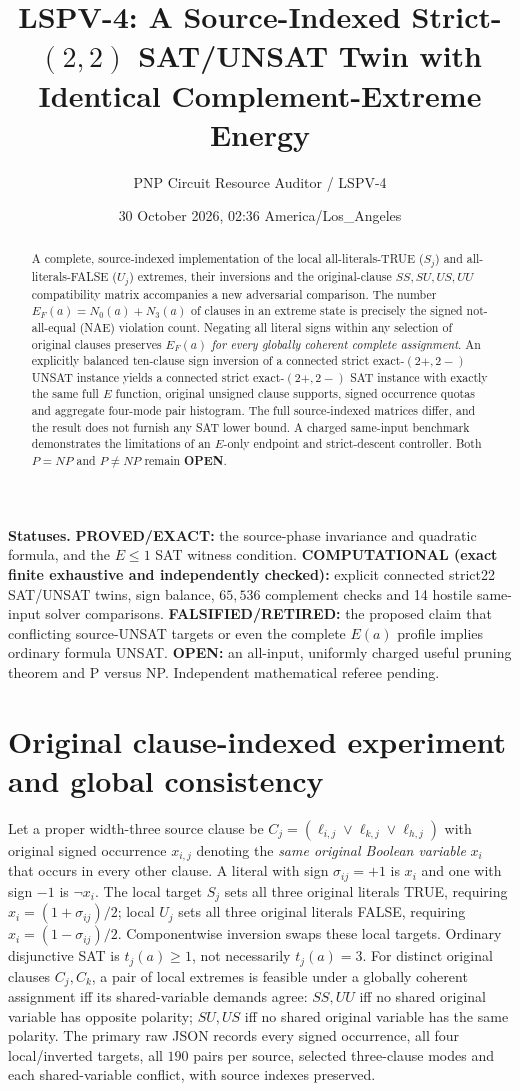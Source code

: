 \documentclass[10pt]{article}
\title{LSPV-4: A Source-Indexed Strict-$(2,2)$ SAT/UNSAT Twin with Identical Complement-Extreme Energy}
\author{PNP Circuit Resource Auditor / LSPV-4}
\date{30 October 2026, 02:36 America/Los\_Angeles}
\begin{document}
\maketitle
\begin{abstract}
A complete, source-indexed implementation of the local all-literals-TRUE ($S_j$) and all-literals-FALSE ($U_j$) extremes, their inversions and the original-clause $SS,SU,US,UU$ compatibility matrix accompanies a new adversarial comparison. The number $E_F(a)=N_0(a)+N_3(a)$ of clauses in an extreme state is precisely the signed not-all-equal (NAE) violation count. Negating all literal signs within any selection of original clauses preserves $E_F(a)$ \emph{for every globally coherent complete assignment}. An explicitly balanced ten-clause sign inversion of a connected strict exact-$(2+,2-)$ UNSAT instance yields a connected strict exact-$(2+,2-)$ SAT instance with exactly the same full $E$ function, original unsigned clause supports, signed occurrence quotas and aggregate four-mode pair histogram. The full source-indexed matrices differ, and the result does not furnish any SAT lower bound. A charged same-input benchmark demonstrates the limitations of an $E$-only endpoint and strict-descent controller. Both $P=NP$ and $P\ne NP$ remain \textbf{OPEN}.
\end{abstract}
\noindent\textbf{Statuses.} \textbf{PROVED/EXACT:} the source-phase invariance and quadratic formula, and the $E\le1$ SAT witness condition. \textbf{COMPUTATIONAL (exact finite exhaustive and independently checked):} explicit connected strict22 SAT/UNSAT twins, sign balance, $65{,}536$ complement checks and 14 hostile same-input solver comparisons. \textbf{FALSIFIED/RETIRED:} the proposed claim that conflicting source-UNSAT targets or even the complete $E(a)$ profile implies ordinary formula UNSAT. \textbf{OPEN:} an all-input, uniformly charged useful pruning theorem and P versus NP. Independent mathematical referee pending.
\section{Original clause-indexed experiment and global consistency}
Let a proper width-three source clause be $C_j=(\ell_{i,j}\vee\ell_{k,j}\vee\ell_{h,j})$ with original signed occurrence $x_{i,j}$ denoting the \emph{same original Boolean variable} $x_i$ that occurs in every other clause. A literal with sign $\sigma_{ij}=+1$ is $x_i$ and one with sign $-1$ is $\neg x_i$. The local target $S_j$ sets all three original literals TRUE, requiring $x_i=(1+\sigma_{ij})/2$; local $U_j$ sets all three original literals FALSE, requiring $x_i=(1-\sigma_{ij})/2$. Componentwise inversion swaps these local targets. Ordinary disjunctive SAT is $t_j(a)\ge1$, not necessarily $t_j(a)=3$. For distinct original clauses $C_j,C_k$, a pair of local extremes is feasible under a globally coherent assignment iff its shared-variable demands agree: $SS,UU$ iff no shared original variable has opposite polarity; $SU,US$ iff no shared original variable has the same polarity. The primary raw JSON records every signed occurrence, all four local/inverted targets, all $190$ pairs per source, selected three-clause modes and each shared-variable conflict, with source indexes preserved.
\end{document}
